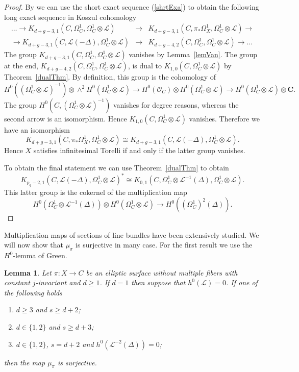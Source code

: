 \documentclass{amsart}
\newcommand{\C}{\mathbf{C}}
\newcommand{\cL}{\mathcal{L}}
\newcommand{\cO}{\mathcal{O}}
\newtheorem{lemma}[theorem]{Lemma}
\theoremstyle{definition}
\theoremstyle{remark}
\begin{document}
\begin{proof}
By \cite[Corollary 1.d.4]{GreenKos} we can use the short exact sequence (\ref{shrtExa}) to obtain the following long exact sequence in Koszul cohomology 
\begin{eqnarray*}
 \dots \to K_{d+g-3,1}(C,\Omega^1_C,\Omega^1_C\otimes \cL) &\to&  K_{d+g-3,1}(C,\pi_*\Omega^1_X,\Omega^1_C\otimes \cL) \to  \\
  \to K_{d+g-3,1}(C,\cL(-\Delta),\Omega^1_C\otimes \cL)
 &\to& K_{d+g-4,2}(C,\Omega^1_C,\Omega^1_C\otimes \cL) \to  \dots \end{eqnarray*}
The group $K_{d+g-3,1}(C,\Omega^1_C,\Omega^1_C\otimes \cL)$ vanishes by Lemma~\ref{lemVan}. The group at the end, $K_{d+g-4,2}(C,\Omega^1_C,\Omega^1_C\otimes \cL)$, is dual to $K_{1,0}(C, \Omega^1_C\otimes \cL)$ by Theorem~\ref{dualThm}.
By definition, this group  is the cohomology of
\[ H^0((\Omega^1_C\otimes \cL)^{-1} ) \otimes \wedge^{2} H^0(\Omega^1_C \otimes \cL) \to H^0(\cO_C) \otimes   H^0(\Omega^1_C\otimes \cL) \to H^0(\Omega^1_C \otimes \cL)\otimes \C .\]
The group $H^0(C,(\Omega^1_C\otimes \cL)^{-1} )$ vanishes for degree reasons, whereas the second arrow is an isomorphism. Hence $ K_{1,0}(C, \Omega^1_C\otimes \cL)$ vanishes.
Therefore we have an isomorphism
\[ K_{d+g-3,1}(C,\pi_*\Omega^1_X,\Omega^1_C\otimes \cL)  \cong K_{d+g-3,1}(C,\cL(-\Delta),\Omega^1_C\otimes \cL).\]
Hence $X$ satisfies infinitesimal Torelli if and only if the latter group vanishes.

To obtain the final statement we can use Theorem~\ref{dualThm} to obtain
\[ K_{p_g-2,1}(C, \cL(-\Delta),\Omega^1_C\otimes \cL)^* \cong  K_{0,1}(C, \Omega^1_C\otimes \cL^{-1}(\Delta),\Omega^1_C\otimes \cL).\]
This latter group is the cokernel of the multiplication map
\[
 H^0(\Omega^1_C\otimes \cL^{-1}(\Delta))\otimes H^0(\Omega^1_C\otimes \cL) \to H^0((\Omega^1_C)^ 2(\Delta)).\]
\end{proof}



Multiplication maps of sections of line bundles have been extensively studied. We will now show that $\mu_\pi$ is surjective in many case.  For the first result we use  the $H^0$-lemma of Green.
\begin{lemma} \label{lemKosVanA} Let $\pi: X \to C$ be an elliptic surface without multiple fibers with constant $j$-invariant and $d\geq 1$. If $d=1$ then suppose that $h^0(\cL)=0$.
If one of the following holds 
\begin{enumerate}
\item  $d\geq 3$ and $s\geq d+2$;
\item  $d\in \{1,2\}$ and $s\geq d+3$;
\item $d\in \{1,2\}$, $s=d+2$ and $h^0(\cL^{-2}(\Delta))=0$;
\end{enumerate}
then the map $\mu_{\pi}$ is surjective.
\end{lemma}
\end{document}
